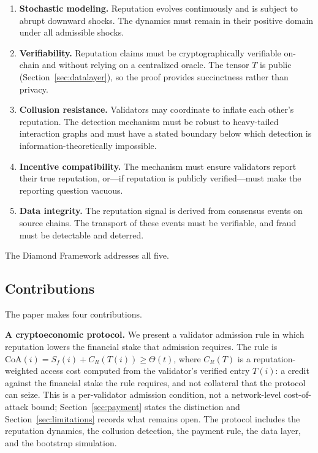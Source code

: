 \documentclass[11pt,a4paper]{article}
\numberwithin{equation}{section}
\numberwithin{table}{section}
\begin{document}
\begin{enumerate}[leftmargin=*]
\item \textbf{Stochastic modeling.} Reputation evolves continuously and is subject to abrupt downward shocks. The dynamics must remain in their positive domain under all admissible shocks.
\item \textbf{Verifiability.} Reputation claims must be cryptographically verifiable on-chain and without relying on a centralized oracle. The tensor $T$ is public (Section~\ref{sec:datalayer}), so the proof provides succinctness rather than privacy.
\item \textbf{Collusion resistance.} Validators may coordinate to inflate each other's reputation. The detection mechanism must be robust to heavy-tailed interaction graphs and must have a stated boundary below which detection is information-theoretically impossible.
\item \textbf{Incentive compatibility.} The mechanism must ensure validators report their true reputation, or---if reputation is publicly verified---must make the reporting question vacuous.
\item \textbf{Data integrity.} The reputation signal is derived from consensus events on source chains. The transport of these events must be verifiable, and fraud must be detectable and deterred.
\end{enumerate}

The Diamond Framework addresses all five.

\subsection{Contributions}
The paper makes four contributions.

\textbf{A cryptoeconomic protocol.} We present a validator admission rule in which reputation lowers the financial stake that admission requires. The rule is $\mathrm{CoA}(i) = S_f(i) + C_R(T(i)) \geq \Theta(t)$, where $C_R(T)$ is a reputation-weighted access cost computed from the validator's verified entry $T(i)$: a credit against the financial stake the rule requires, and not collateral that the protocol can seize. This is a per-validator admission condition, not a network-level cost-of-attack bound; Section~\ref{sec:payment} states the distinction and Section~\ref{sec:limitations} records what remains open. The protocol includes the reputation dynamics, the collusion detection, the payment rule, the data layer, and the bootstrap simulation.
\end{document}
